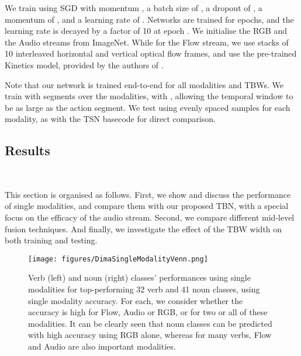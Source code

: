 \documentclass[10pt,twocolumn,letterpaper]{article}
\begin{document}
We train using SGD with momentum \cite{Qian:1999}, a batch size of , a dropout of , 
a momentum of , and a learning rate of . Networks are trained for  epochs, and the learning
rate is decayed by a factor of 10 at epoch . 
We initialise the RGB and the Audio streams from ImageNet. While for the Flow stream, we use stacks of 10 interleaved horizontal and vertical optical flow frames, and use the pre-trained Kinetics \cite{Carreira_2017_CVPR} model, provided by the authors of \cite{TSN2016ECCV}. 

Note that our network is trained end-to-end for all modalities and TBWs. 
We train with  segments over the  modalities, with , allowing the temporal window to be as large as the action segment.
We test using  evenly spaced samples for each modality, as with the TSN basecode for direct comparison.



\subsection{Results}~\label{sec:results}
\vspace*{-12pt}

This section is organised as follows. First, we show and discuss the performance of single modalities,
and compare them with our proposed TBN, with a special focus on the efficacy of the audio stream. 
Second, we compare different mid-level fusion techniques.
And finally, we investigate the effect of the TBW width on both training and testing.

\begin{figure}[t]
\texttt{[image: figures/DimaSingleModalityVenn.png]}
\caption{Verb (left) and noun (right) classes' performances using single modalities for top-performing 32 verb and 41 noun classes, using single modality accuracy. For each, we consider whether the accuracy is high for Flow, Audio or RGB, or for two or all of these modalities. It can be clearly seen that noun classes can be predicted with high accuracy using RGB alone, whereas for many verbs, Flow and Audio are also important modalities. }
\label{fig:venn}
\end{figure}
\end{document}

